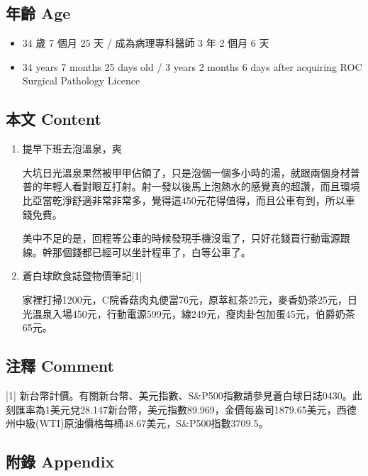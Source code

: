 \documentclass[a5paper, 10pt
]{book}
\providecommand{\tightlist}{%
  \setlength{\itemsep}{0pt}\setlength{\parskip}{0pt}}
\begin{document}
\hypertarget{ux5e74ux9f61-age-17}{%
\subsection{年齡 Age}\label{ux5e74ux9f61-age-17}}

\begin{itemize}
\tightlist
\item
  34 歲 7 個月 25 天 / 成為病理專科醫師 3 年 2 個月 6 天
\item
  34 years 7 months 25 days old / 3 years 2 months 6 days after
  acquiring ROC Surgical Pathology Licence
\end{itemize}

\hypertarget{ux672cux6587-content-17}{%
\subsection{本文 Content}\label{ux672cux6587-content-17}}

\begin{enumerate}
\def\labelenumi{\arabic{enumi}.}
\item
  提早下班去泡溫泉，爽

  大坑日光溫泉果然被甲甲佔領了，只是泡個一個多小時的湯，就跟兩個身材普普的年輕人看對眼互打射。射一發以後馬上泡熱水的感覺真的超讚，而且環境比亞當乾淨舒適非常非常多，覺得這450元花得值得，而且公車有到，所以車錢免費。

  美中不足的是，回程等公車的時候發現手機沒電了，只好花錢買行動電源跟線。幹那個錢都已經可以坐計程車了，白等公車了。
\item
  蒼白球飲食誌暨物價筆記{[}1{]}

  家裡打掃1200元，C院香菇肉丸便當76元，原萃紅茶25元，麥香奶茶25元，日光溫泉入場450元，行動電源599元，線249元，瘦肉卦包加蛋45元，伯爵奶茶65元。
\end{enumerate}

\hypertarget{ux6ce8ux91cb-comment-17}{%
\subsection{注釋 Comment}\label{ux6ce8ux91cb-comment-17}}

{[}1{]}
新台幣計價。有關新台幣、美元指數、S\&P500指數請參見蒼白球日誌0430。此刻匯率為1美元兌28.147新台幣，美元指數89.969，金價每盎司1879.65美元，西德州中級(WTI)原油價格每桶48.67美元，S\&P500指數3709.5。

\hypertarget{ux9644ux9304-appendix-17}{%
\subsection{附錄 Appendix}\label{ux9644ux9304-appendix-17}}
\end{document}
